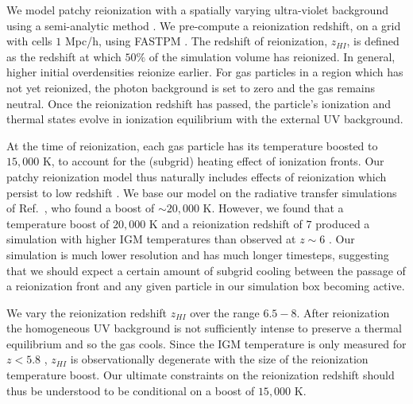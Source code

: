 \documentclass[a4paper,11pt]{article}
\begin{document}
We model patchy reionization with a spatially varying ultra-violet background using a semi-analytic method \cite{Battaglia:2013}. We pre-compute a reionization redshift, on a grid with cells $1$ Mpc/h, using FASTPM \cite{FASTPM}. The redshift of reionization, $z_{HI}$, is defined as the redshift at which $50\%$ of the simulation volume has reionized. In general, higher initial overdensities reionize earlier. For gas particles in a region which has not yet reionized, the photon background is set to zero and the gas remains neutral. Once the reionization redshift has passed, the particle's ionization and thermal states evolve in ionization equilibrium with the external UV background.

At the time of reionization, each gas particle has its temperature boosted to $15,000$ K, to account for the (subgrid) heating effect of ionization fronts. Our patchy reionization model thus naturally includes effects of reionization which persist to low redshift \citep{Montero:2019}.
We base our model on the radiative transfer simulations of Ref.~\citep{DAloisio:2019}, who found a boost of $\sim 20,000$ K. However, we found that a temperature boost of $20,000$ K and a reionization redshift of $7$ produced a simulation with higher IGM temperatures than observed at $z\sim 6$ \cite{Gaikwad:2020}. Our simulation is much lower resolution and has much longer timesteps, suggesting that we should expect a certain amount of subgrid cooling between the passage of a reionization front and any given particle in our simulation box becoming active. %

We vary the reionization redshift $z_{HI}$ over the range $6.5 - 8$. After reionization the homogeneous UV background is not sufficiently intense to preserve a thermal equilibrium and so the gas cools. Since the IGM temperature is only measured for $z < 5.8$ \cite{Gaikwad:2020}, $z_{HI}$ is observationally degenerate with the size of the reionization temperature boost. Our ultimate constraints on the reionization redshift should thus be understood to be conditional on a boost of $15,000$ K.



\end{document}
